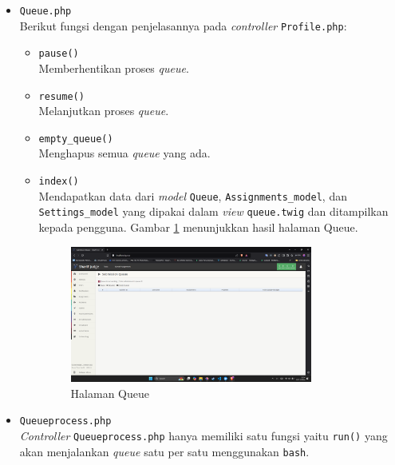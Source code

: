 \documentclass[a4paper,twoside]{article}
\begin{document}
\begin{enumerate}
\begin{itemize}
\begin{itemize}
			            \item \verb|Queue.php| \\
			                  Berikut fungsi dengan penjelasannya pada \textit{controller} \verb|Profile.php|:

			                  \begin{itemize}
				                  \item \verb|pause()| \\
				                        Memberhentikan proses \textit{queue}.
				                  \item \verb|resume()| \\
				                        Melanjutkan proses \textit{queue}.
				                  \item \verb|empty_queue()| \\
				                        Menghapus semua \textit{queue} yang ada.
				                  \item \verb|index()| \\
				                        Mendapatkan data dari \textit{model} \verb|Queue|, \verb|Assignments_model|, dan \verb|Settings_model| yang dipakai dalam \textit{view} \verb|queue.twig| dan ditampilkan kepada pengguna. Gambar \ref{fig:3:1:1:queue} menunjukkan hasil halaman Queue.

				                        \begin{figure}[H]
					                        \centering
					                        \includegraphics[width=0.8\textwidth]{views/queue.png}
					                        \caption{Halaman Queue}
					                        \label{fig:3:1:1:queue}
				                        \end{figure}

			                  \end{itemize}

			            \item \verb|Queueprocess.php| \\
			                  \textit{Controller} \verb|Queueprocess.php| hanya memiliki satu fungsi yaitu \verb|run()| yang akan menjalankan \textit{queue} satu per satu menggunakan \verb|bash|.


\end{itemize}
\end{itemize}
\end{enumerate}
\end{document}
